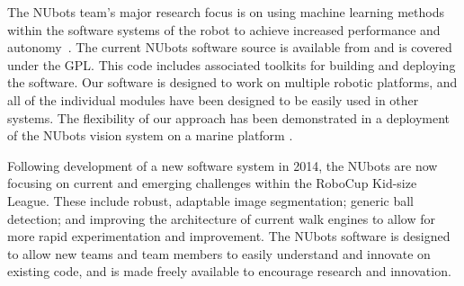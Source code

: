 \documentclass{llncs}
\begin{document}

The NUbots team's major research focus is on using machine learning methods within the software systems of the robot to achieve increased performance and autonomy~\cite{ChalupEtAlSMC2007}. The current NUbots software source is available from \cite{nubotsGit} and is covered under the GPL. This code includes associated toolkits for building and deploying the software. Our software is designed to work on multiple robotic platforms, and all of the individual modules have been designed to be easily used in other systems. The flexibility of our approach has been demonstrated in a deployment of the NUbots vision system on a marine platform \cite{renton2014robotx}. %

Following development of a new software system in 2014, the NUbots are now focusing on current and emerging challenges within the RoboCup Kid-size League. These include robust, adaptable image segmentation; generic ball detection; and improving the architecture of current walk engines to allow for more rapid experimentation and improvement. The NUbots software is designed to allow new teams and team members to easily understand and innovate on existing code, and is made freely available to encourage research and innovation.


\end{document}

